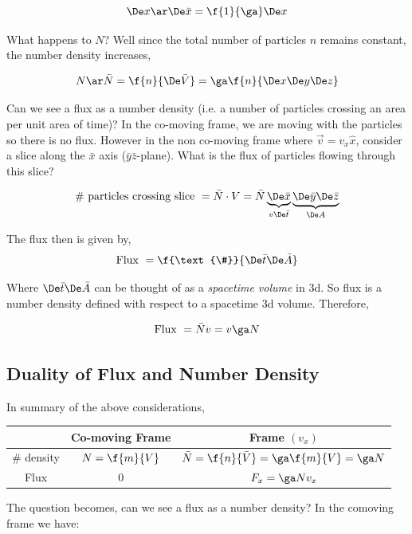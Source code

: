 \documentclass{article}
\begin{document}
\[ \De x \ar \De \bar{x} = \f{1}{\ga} \De x \]

What happens to $N$? Well since the total number of particles $n$ remains constant, the number density increases,

\[ N \ar \bar{N} = \f{n}{\De \bar{V}} = \ga \f{n}{\De x\De y\De z} \]

Can we see a flux as a number density (i.e. a number of particles crossing an area per unit area of time)? In the co-moving frame, we are moving with the particles so there is no flux. However in the non co-moving frame where $\vec{v} = v_x \hat{x}$, consider a slice along the $\bar{x}$ axis ($\bar{y}\bar{z}$-plane). What is the flux of particles flowing through this slice?

\[ \text{\# particles crossing slice } = \bar{N} \cdot V = \bar{N} \underbrace{\De \bar{x}}_{v\De \bar{t}} \underbrace{\De \bar{y} \De \bar{z}}_{\De A} \]

The flux then is given by,
\[ \text{Flux } = \f{\text{\#}}{\De \bar{t} \De \bar{A}} \]

Where $\De \bar{t} \De \bar{A}$ can be thought of as a \textit{spacetime volume} in 3d. So flux is a number density defined with respect to a spacetime 3d volume. Therefore,

\[ \text{Flux } = \bar{N} v = v \ga N \]

\subsection{Duality of Flux and Number Density}

In summary of the above considerations,

\begin{center}
\begin{tabular}{|c|c|c|}
    \hline
    & Co-moving Frame & Frame $(v_x)$ \\
    \hline
    \# density & $N = \f{m}{V}$ & $\bar{N} = \f{n}{\bar{V}}= \ga \f{m}{V} = \ga N$ \\
    \hline
    Flux & $0$ & $F_x = \ga N v_x$ \\
    \hline
\end{tabular}
\end{center}

The question becomes, can we see a flux as a number density? In the comoving frame we have:
\end{document}

